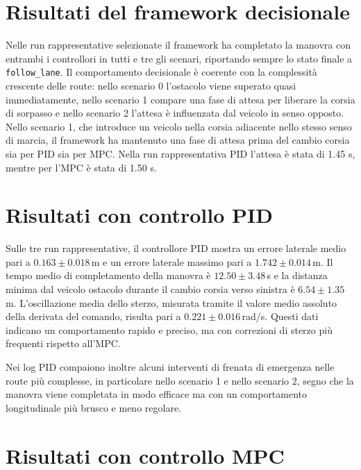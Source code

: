 \section{Risultati del framework decisionale}

Nelle run rappresentative selezionate il framework ha completato la manovra con entrambi i controllori in tutti e tre gli scenari, riportando sempre lo stato finale a \texttt{follow\_lane}. Il comportamento decisionale è coerente con la complessità crescente delle route: nello scenario 0 l'ostacolo viene superato quasi immediatamente, nello scenario 1 compare una fase di attesa per liberare la corsia di sorpasso e nello scenario 2 l'attesa è influenzata dal veicolo in senso opposto. Nello scenario 1, che introduce un veicolo nella corsia adiacente nello stesso senso di marcia, il framework ha mantenuto una fase di attesa prima del cambio corsia sia per PID sia per MPC. Nella run rappresentativa PID l'attesa è stata di 1.45 s, mentre per l'MPC è stata di 1.50 s. 



\section{Risultati con controllo PID}

Sulle tre run rappresentative, il controllore PID mostra un errore laterale medio pari a $0.163 \pm 0.018$\,m e un errore laterale massimo pari a $1.742 \pm 0.014$\,m. Il tempo medio di completamento della manovra è $12.50 \pm 3.48$\,s e la distanza minima dal veicolo ostacolo durante il cambio corsia verso sinistra è $6.54 \pm 1.35$\,m. L'oscillazione media dello sterzo, misurata tramite il valore medio assoluto della derivata del comando, risulta pari a $0.221 \pm 0.016$\,rad/s. Questi dati indicano un comportamento rapido e preciso, ma con correzioni di sterzo più frequenti rispetto all'MPC.

Nei log PID compaiono inoltre alcuni interventi di frenata di emergenza nelle route più complesse, in particolare nello scenario 1 e nello scenario 2, segno che la manovra viene completata in modo efficace ma con un comportamento longitudinale più brusco e meno regolare.





\section{Risultati con controllo MPC}

